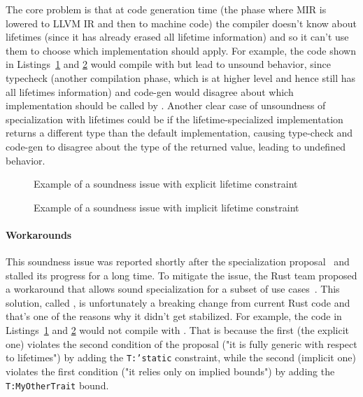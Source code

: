 The core problem is that at code generation time (the phase where MIR is lowered to LLVM IR and then to machine code) the compiler doesn't know about lifetimes (since it has already erased all lifetime information) and so it can't use them to choose which implementation should apply.
For example, the code shown in Listings~\ref{fig:soundness-lifetimes-explicit} and \ref{fig:soundness-lifetimes-implicit} would compile with  but lead to unsound behavior, since typecheck (another compilation phase, which is at higher level and hence still has all lifetimes information) and code-gen would disagree about which implementation should be called by .
Another clear case of unsoundness of specialization with lifetimes could be if the lifetime-specialized implementation returns a different type than the default implementation, causing type-check and code-gen to disagree about the type of the returned value, leading to undefined behavior.
\begin{figure}[htbp!]
	\centering
	\captionsetup{type=listing,skip=2pt}
	\caption{Example of a soundness issue with explicit lifetime constraint}
	\label{fig:soundness-lifetimes-explicit}
\end{figure}

\begin{figure}[htbp!]
	\centering
	\captionsetup{type=listing,skip=2pt}
	\caption{Example of a soundness issue with implicit lifetime constraint}
	\label{fig:soundness-lifetimes-implicit}
\end{figure}

\paragraph{Workarounds}
This soundness issue was reported shortly after the specialization proposal~\cite{SpecializationSoundness} and stalled its progress for a long time.
To mitigate the issue, the Rust team proposed a workaround that allows sound specialization for a subset of use cases~\cite{MinSpecialization}.
This solution, called , is unfortunately a breaking change from current Rust code and that's one of the reasons why it didn't get stabilized.
For example, the code in Listings~\ref{fig:soundness-lifetimes-explicit} and \ref{fig:soundness-lifetimes-implicit} would not compile with .
That is because the first (the explicit one) violates the second condition of the proposal ("it is fully generic with respect to lifetimes") by adding the \texttt{T:\@ 'static} constraint, while the second (implicit one) violates the first condition ("it relies only on implied bounds") by adding the \texttt{T:\@ MyOtherTrait} bound.

